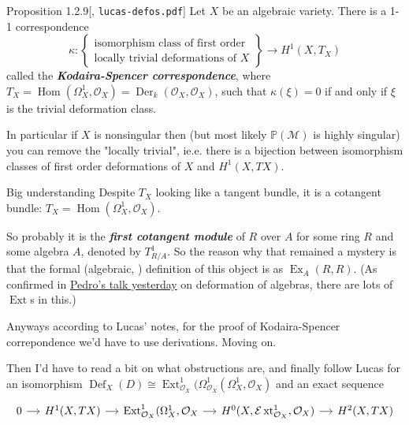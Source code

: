 \begin{thing4}{Proposition 1.2.9}[\cite{def0}, \texttt{lucas-defos.pdf}]\label{prop:1.2.9}\leavevmode
Let \(X\) be an algebraic variety. There is a 1-1 correspondence
\[\kappa: \left\{ \substack{\text{isomorphism class of first order}  \\ \text{locally trivial deformations of \(X\)} } \right\} \longrightarrow H^{1}(X,T_X)\]
called the \textit{\textbf{Kodaira-Spencer correspondence}}, where \(T_X=\operatorname{Hom}(\Omega^1_X,\mathcal{O}_X)= \operatorname{Der}_k(\mathcal{O}_X,\mathcal{O}_X)\), such that \(\kappa(\xi)=0\) if and only if \(\xi\) is the trivial deformation class.

In particular if \(X\) is nonsingular then {\color{2}(but most likely \(\mathbb{P}(\mathcal{M})\) is highly singular)} you can remove the "locally trivial", ie.e. there is a bijection between isomorphism classes of first order deformations of \(X\) and \(H^{1}(X,TX)\).
\end{thing4}

\iffalse

\begin{thing2}{Big understanding}\leavevmode
Despite \(T_X\) looking like a tangent bundle, it is a cotangent bundle: \(T_X=\operatorname{Hom}(\Omega^1_X,\mathcal{O}_X)\).
\end{thing2}

So probably it is the \textit{\textbf{first cotangent module}} of \(R\) over \(A\) for some ring \(R\) and some algebra \(A\), denoted by \(T^1_{R/A}\). So the reason why that remained a mystery is that the formal (algebraic, \cite{def0}) definition of this object is as \(\operatorname{Ex}_A(R,R)\). (As confirmed in \href{https://seminarios.impa.br/visualizar/10126}{Pedro's talk yesterday} on deformation of algebras, there are lots of \(\operatorname{Ex t}\)s in this.)

Anyways according to Lucas' notes, for the proof of Kodaira-Spencer correpondence we'd have to use derivations. Moving on.

Then I'd have to read a bit on what obstructions are, and finally follow Lucas for an isomorphism \(\operatorname{Def}_X(D) \cong \operatorname{Ex t}^1_{\mathcal{O}_X}(\Omega^1_{\mathcal{O}_X}(\Omega^1_X,\mathcal{O}_X)\) and an exact sequence 
\[\begin{tikzcd}[column sep=small]
	0\arrow[r]&H^{1}(X,TX)\arrow[r]&\operatorname{Ex t}^1_{\mathcal{O}_X}(\Omega^1_X,\mathcal{O}_X\arrow[r]&H^{0}(X, \mathcal{E}\operatorname{x t}^1_{\mathcal{O}_X},\mathcal{O}_X)\arrow[r]&H^{2}(X,TX)
\end{tikzcd}\]

